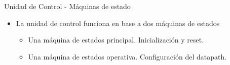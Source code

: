 \begin{frame}{Unidad de Control - Máquinas de estado}
  
  \begin{itemize}
    \item<1-> La unidad de control funciona en base a dos máquinas de estados
    \begin{itemize}
      \Fontitit
      \item<2-> Una máquina de estados principal. Inicialización y reset.
      \item<4-> Una máquina de estados operativa. Configuración del datapath.
    \end{itemize}
  \end{itemize}
  
  \begin{columns}[T]
    
  \end{columns}
\end{frame}

